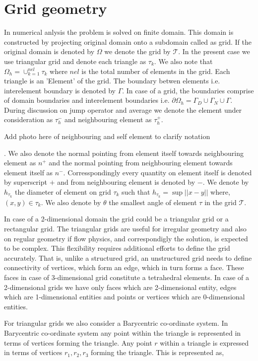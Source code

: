\documentclass[a4paper,12pt]{book}
\begin{document}
\section{Grid geometry}

In numerical anlysis the problem is solved on finite domain. This domain is constructed by projecting original domain onto a subdomain called as grid. If the original domain is denoted by $\Omega$ we denote the grid by $\mathcal{T}$. In the present case we use triangular grid and denote each triangle as $\tau_k$. We also note that $\Omega_h = \cup_{k=1}^{nel} \tau_k$ where $nel$ is the total number of elements in the grid. Each triangle is an 'Element' of the grid. The boundary betwen elements i.e. interelement boundary is denoted by $\Gamma$. In case of a grid, the boundaries comprise of domain boundaries and interelement boundaries i.e. $\partial \Omega_h = \Gamma_D \cup \Gamma_N \cup \Gamma$. During discussion on jump operator and average we denote the element under consideration as $\tau_{h}^-$ and neighbouring element as $\tau_{h}^+$. \begin{Huge}
Add photo here of neighbouring and self element to clarify notation
\end{Huge}. We also denote the normal pointing from element itself towards neighbouring element as $n^+$ and the normal pointing from neighbouring element towards element itself as $n^-$. Corresspondingly every quantity on element itself is denoted by superscript $+$ and from neighbouring element is denoted by $-$.  We denote by $h_{\tau_k}$ the diameter of element on grid $\tau_k$ such that $h_{\tau_k} = \sup ||x-y||$ where, $(x,y) \in \tau_k$. We also denote by $\theta$ the smallest angle of element $\tau$ in the grid $\mathcal{T}$.

In case of a 2-dimensional domain the grid could be a triangular grid or a rectangular grid. The triangular grids are useful for irregular geometry and also on regular geometry if flow physics, and correspondigly the solution, is expected to be complex. This flexibility requires additional efforts to define the grid accurately. That is, unlike a structured grid, an unstructured grid needs to define connectivity of vertices, which form an edge, which in turn forms a face. These faces in case of 3-dimensional grid constitute a tetrahedral elements. In case of a 2-dimensional grids we have only faces which are 2-dimensional entity, edges which are 1-dimensional entities and points or vertices which are 0-dimensional entities.

For triangular grids we also consider a Barycentric co-ordinate system. In Barycentric co-ordinate system any point within the triangle is represented in terms of vertices forming the triangle. Any point $r$ within a triangle is expressed in terms of vertices $r_1,r_2,r_3$ forming the triangle. This is represented as,
\end{document}
